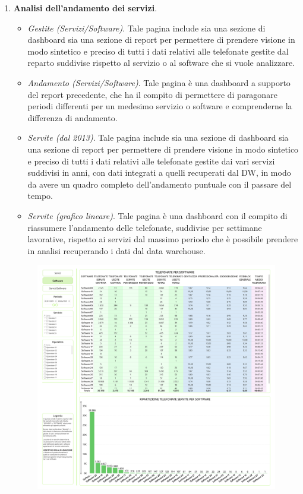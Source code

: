 \begin{enumerate}
        \item \textbf{Analisi dell'andamento dei servizi}.
        \begin{itemize}
            \item \textit{Gestite (Servizi/Software)}. Tale pagina include sia una sezione di dashboard sia una sezione di report per permettere di prendere visione in modo sintetico e preciso di tutti i dati relativi alle telefonate gestite dal reparto suddivise rispetto al servizio o al software che si vuole analizzare.
            \item \textit{Andamento (Servizi/Software)}. Tale pagina è una dashboard a supporto del report precedente, che ha il compito di permettere di paragonare periodi differenti per un medesimo servizio o software e comprenderne la differenza di andamento.
            \item \textit{Servite (dal 2013)}. Tale pagina include sia una sezione di dashboard sia una sezione di report per permettere di prendere visione in modo sintetico e preciso di tutti i dati relativi alle telefonate gestite dai vari servizi suddivisi in anni, con dati integrati a quelli recuperati dal DW, in modo da avere un quadro completo dell'andamento puntuale con il passare del tempo.
            \item \textit{Servite (grafico lineare)}. Tale pagina è una dashboard con il compito di riassumere l'andamento delle telefonate, suddivise per settimane lavorative, rispetto ai servizi dal massimo periodo che è possibile prendere in analisi recuperando i dati dal data warehouse.
        \end{itemize}
        \begin{figure}[H]
        \centering
        \includegraphics[height=0.9\linewidth]{figure/capitolo_4/BI Call Report-3.pdf}

\end{figure}
\end{enumerate}
